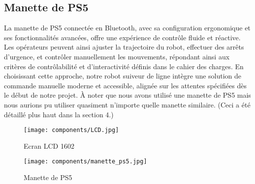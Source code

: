 \begin{comment}
\begin{figure}[h]
    \centering
    \texttt{[image: components/LCD.jpg]}
    \caption{Ecran LCD 1602}
    \label{fig:LCD1602}
\end{figure}
\end{comment}

\newpage

\subsection{Manette de PS5}
La manette de PS5 connectée en Bluetooth, avec sa configuration ergonomique et ses fonctionnalités avancées, offre une expérience de contrôle fluide et réactive. Les opérateurs peuvent ainsi ajuster la trajectoire du robot, effectuer des arrêts d'urgence, et contrôler manuellement les mouvements, répondant ainsi aux critères de contrôlabilité et d'interactivité définis dans le cahier des charges. En choisissant cette approche, notre robot suiveur de ligne intègre une solution de commande manuelle moderne et accessible, alignée sur les attentes spécifiées dès le début de notre projet. À noter que nous avons utilisé une manette de PS5 mais nous aurions pu utiliser quasiment n'importe quelle manette similaire. (Ceci a été détaillé plus haut dans la section 4.)

\begin{comment}
\begin{figure}[h]
    \centering
    \texttt{[image: components/manette\_ps5.jpg]}
    \caption{Manette de PS5}
    \label{fig:Manette de PS5}
\end{figure}
\end{comment}

\bigbreak
\begin{figure}[h]
    \begin{minipage}[c]{.46\linewidth}
        \centering
        \texttt{[image: components/LCD.jpg]}
        \caption{Ecran LCD 1602}
        \label{fig:LCD1602}
    \end{minipage}
    \hfill%
    \begin{minipage}[c]{.46\linewidth}
        \centering
        \texttt{[image: components/manette\_ps5.jpg]}
        \caption{Manette de PS5}
        \label{fig:Manette de PS5}
    \end{minipage}
\end{figure}

\newpage